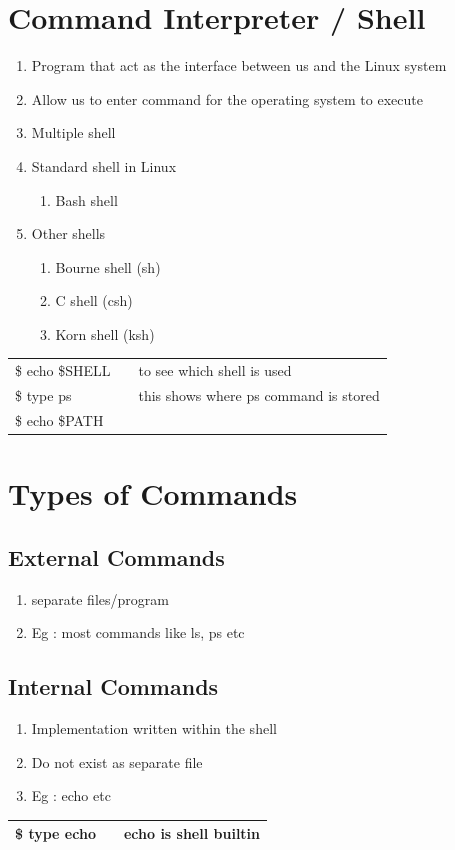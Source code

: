 \documentclass[12pt, a4paper]{report}
\begin{document}
\section{Command Interpreter / Shell}
\begin{enumerate}
\item Program that act as the interface between us and the Linux system
\item Allow us to enter command for the operating system to execute
\item Multiple shell
\item Standard shell in Linux
\begin{enumerate}
\item Bash shell
\end{enumerate}
\item Other shells
\begin{enumerate}
\item Bourne shell (sh)
\item C shell (csh)
\item Korn shell (ksh)
\end{enumerate}
\end{enumerate}
\begin{tabular}{|lcl|}\hline
\$ echo \$SHELL && to see which shell is used\\
\$ type ps && this shows where ps command is stored\\
\$ echo \$PATH && \\ \hline
\end{tabular}
\section{Types of Commands}
\subsection{External Commands}
\begin{enumerate}
\item separate files/program
\item Eg : most commands like ls, ps etc
\end{enumerate}
\subsection{Internal Commands}
\begin{enumerate}
\item Implementation written within the shell
\item Do not exist as separate file
\item Eg : echo etc
\end{enumerate}
\begin{tabular}{|lcr|}\hline
\$ type echo && echo is shell builtin\\ \hline
\end{tabular}
\end{document}
